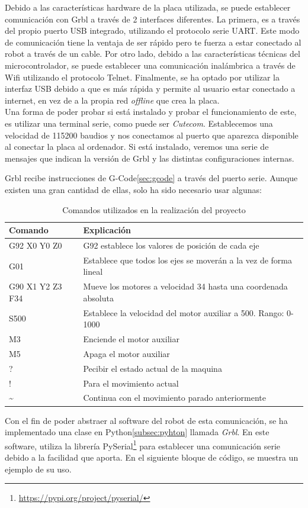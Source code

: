 Debido a las características hardware de la placa utilizada, se puede establecer comunicación con Grbl a través de 2 interfaces diferentes. 
La primera, es a través del propio puerto USB integrado, utilizando el protocolo serie UART. Este modo de comunicación tiene la ventaja de 
ser rápido pero te fuerza a estar conectado al robot a través de un cable. Por otro lado, debido a las características técnicas del 
microcontrolador, se puede establecer una comunicación inalámbrica a través de Wifi utilizando el protocolo Telnet. Finalmente, se ha optado 
por utilizar la interfaz USB debido a que es más rápida y permite al usuario estar conectado a internet, en vez de a la propia red 
\textit{offline} que crea la placa.
\\

Una forma de poder probar si está instalado y probar el funcionamiento de este, es utilizar una terminal serie, como 
puede ser \textit{Cutecom}. Establecemos una velocidad de 115200 baudios y nos conectamos al puerto que aparezca disponible 
al conectar la placa al ordenador. Si está instalado, veremos una serie de mensajes que indican la versión de Grbl y las 
distintas configuraciones internas. 

Grbl recibe instrucciones de G-Code\ref{sec:gcode} a través del puerto serie. Aunque existen una gran 
cantidad de ellas, solo ha sido necesario usar algunas:
\begin{table}[H]
\begin{center}
\begin{tabular}{|l|l|}
\hline
\textbf{Comando} & \textbf{Explicación} \\
\hline
G92 X0 Y0 Z0 & G92 establece los valores de posición de cada eje\\
G01 & Establece que todos los ejes se moverán a la vez de forma lineal  \\
G90 X1 Y2 Z3 F34 & Mueve los motores a velocidad 34 hasta una coordenada absoluta  \\
S500 & Establece la velocidad del motor auxiliar a 500. Rango: 0-1000  \\
M3 & Enciende el motor auxiliar  \\
M5 & Apaga el motor auxiliar  \\
? & Pecibir el estado actual de la maquina  \\
! & Para el movimiento actual \\
\textasciitilde & Continua con el movimiento parado anteriormente \\
\hline
\end{tabular}
\caption{Comandos utilizados en la realización del proyecto}
\end{center}
\end{table}
\newpage
Con el fin de poder abstraer al software del robot de esta comunicación, se ha implementado 
una clase en Python\ref{subsec:pyhton} llamada \textit{Grbl}. En este software, utiliza la librería 
PySerial\footnote{\url{https://pypi.org/project/pyserial/}} para establecer una comunicación serie 
debido a la facilidad que aporta. En el siguiente bloque de código, se muestra un ejemplo de su uso.

